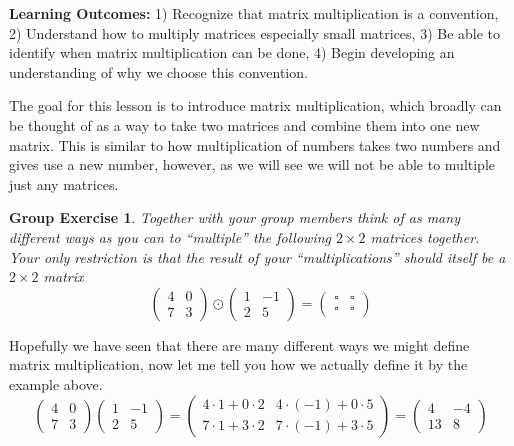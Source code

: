 \documentclass[10pt,reqno]{amsart}
\newtheorem{groupExercise}[lemma]{Group Exercise}
\theoremstyle{remark}
\renewcommand{\O}{\mathcal{O}}
\begin{document}
 




\setcounter{section}{1}

\textbf{Learning Outcomes:} 1) Recognize that matrix multiplication is a convention, 2) Understand how to multiply matrices especially small matrices, 3) Be able to identify when matrix multiplication can be done, 4) Begin developing an understanding of why we choose this convention. 

The goal for this lesson is to introduce matrix multiplication, which broadly can be thought of as a way to take two matrices and combine them into one new matrix. This is similar to how multiplication of numbers takes two numbers and gives use a new number, however, as we will see we will not be able to multiple just any matrices. 

\begin{groupExercise}
Together with your group members think of as many different ways as you can to ``multiple'' the following $2\times 2$ matrices together. Your only restriction is that the result of your ``multiplications'' should itself be a $2\times 2$ matrix
\[
\begin{pmatrix}
4 & 0 \\
7 & 3 \end{pmatrix} \odot 
\begin{pmatrix} 1 & -1 \\
2 & 5 
\end{pmatrix}
=\begin{pmatrix} \square & \square \\
\square & \square
\end{pmatrix}
\]
\end{groupExercise}

Hopefully we have seen that there are many different ways we might define matrix multiplication, now let me tell you how we actually define it by the example above. 
\[
\begin{pmatrix}
4 & 0 \\
7 & 3 \end{pmatrix}  
\begin{pmatrix} 1 & -1 \\
2 & 5 
\end{pmatrix}
=\begin{pmatrix} 4\cdot1+0\cdot2 & 4\cdot(-1)+0\cdot5  \\
7\cdot1+3\cdot2 & 7\cdot(-1)+3\cdot5
\end{pmatrix}=\begin{pmatrix}
4 & -4 \\
13 & 8
\end{pmatrix}
\]
\end{document}
